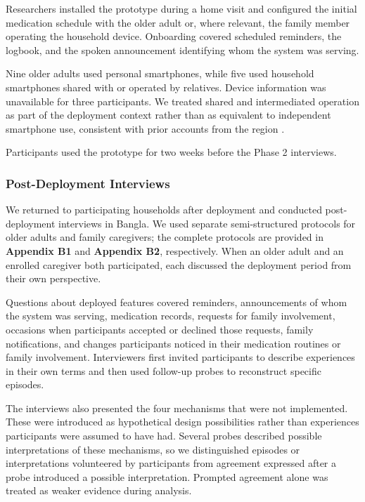Researchers installed the prototype during a home visit and configured the initial medication schedule with the older adult or, where relevant, the family member operating the household device. Onboarding covered scheduled reminders, the logbook, and the spoken announcement identifying whom the system was serving.

Nine older adults used personal smartphones, while five used household smartphones shared with or operated by relatives. Device information was unavailable for three participants. We treated shared and intermediated operation as part of the deployment context rather than as equivalent to independent smartphone use, consistent with prior accounts from the region \cite{1,33,98}.

Participants used the prototype for two weeks before the Phase 2 interviews.

\subsubsection{Post-Deployment Interviews}

We returned to participating households after deployment and conducted post-deployment interviews in Bangla. We used separate semi-structured protocols for older adults and family caregivers; the complete protocols are provided in \textbf{Appendix B1} and \textbf{Appendix B2}, respectively. When an older adult and an enrolled caregiver both participated, each discussed the deployment period from their own perspective.

Questions about deployed features covered reminders, announcements of whom the system was serving, medication records, requests for family involvement, occasions when participants accepted or declined those requests, family notifications, and changes participants noticed in their medication routines or family involvement. Interviewers first invited participants to describe experiences in their own terms and then used follow-up probes to reconstruct specific episodes.

The interviews also presented the four mechanisms that were not implemented. These were introduced as hypothetical design possibilities rather than experiences participants were assumed to have had. Several probes described possible interpretations of these mechanisms, so we distinguished episodes or interpretations volunteered by participants from agreement expressed after a probe introduced a possible interpretation. Prompted agreement alone was treated as weaker evidence during analysis.

